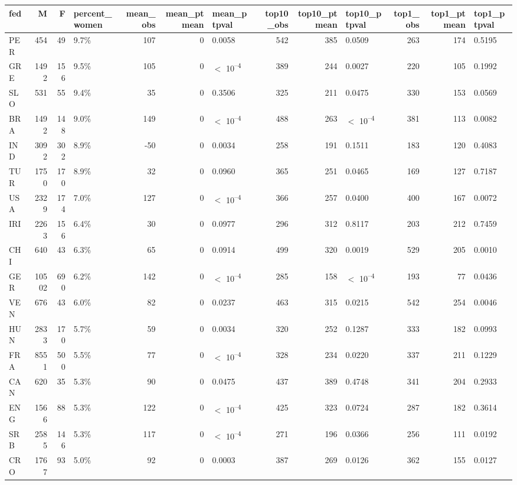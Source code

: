 
\begin{tabular}[t]{lrrlrrlrrlrrl}
\toprule
fed & M & F & percent_women & mean_obs & mean_ptmean & mean_ptpval & top10_obs & top10_ptmean & top10_ptpval & top1_obs & top1_ptmean & top1_ptpval\\
\midrule
PER & 454 & 49 & 9.7\% & 107 & 0 & 0.0058 & 542 & 385 & 0.0509 & 263 & 174 & 0.5195\\
GRE & 1492 & 156 & 9.5\% & 105 & 0 & $<$ 10\textsuperscript{--4} & 389 & 244 & 0.0027 & 220 & 105 & 0.1992\\
SLO & 531 & 55 & 9.4\% & 35 & 0 & 0.3506 & 325 & 211 & 0.0475 & 330 & 153 & 0.0569\\
BRA & 1492 & 148 & 9.0\% & 149 & 0 & $<$ 10\textsuperscript{--4} & 488 & 263 & $<$ 10\textsuperscript{--4} & 381 & 113 & 0.0082\\
IND & 3092 & 302 & 8.9\% & -50 & 0 & 0.0034 & 258 & 191 & 0.1511 & 183 & 120 & 0.4083\\
TUR & 1750 & 170 & 8.9\% & 32 & 0 & 0.0960 & 365 & 251 & 0.0465 & 169 & 127 & 0.7187\\
USA & 2329 & 174 & 7.0\% & 127 & 0 & $<$ 10\textsuperscript{--4} & 366 & 257 & 0.0400 & 400 & 167 & 0.0072\\
IRI & 2263 & 156 & 6.4\% & 30 & 0 & 0.0977 & 296 & 312 & 0.8117 & 203 & 212 & 0.7459\\
CHI & 640 & 43 & 6.3\% & 65 & 0 & 0.0914 & 499 & 320 & 0.0019 & 529 & 205 & 0.0010\\
GER & 10502 & 690 & 6.2\% & 142 & 0 & $<$ 10\textsuperscript{--4} & 285 & 158 & $<$ 10\textsuperscript{--4} & 193 & 77 & 0.0436\\
VEN & 676 & 43 & 6.0\% & 82 & 0 & 0.0237 & 463 & 315 & 0.0215 & 542 & 254 & 0.0046\\
HUN & 2833 & 170 & 5.7\% & 59 & 0 & 0.0034 & 320 & 252 & 0.1287 & 333 & 182 & 0.0993\\
FRA & 8551 & 500 & 5.5\% & 77 & 0 & $<$ 10\textsuperscript{--4} & 328 & 234 & 0.0220 & 337 & 211 & 0.1229\\
CAN & 620 & 35 & 5.3\% & 90 & 0 & 0.0475 & 437 & 389 & 0.4748 & 341 & 204 & 0.2933\\
ENG & 1566 & 88 & 5.3\% & 122 & 0 & $<$ 10\textsuperscript{--4} & 425 & 323 & 0.0724 & 287 & 182 & 0.3614\\
SRB & 2585 & 146 & 5.3\% & 117 & 0 & $<$ 10\textsuperscript{--4} & 271 & 196 & 0.0366 & 256 & 111 & 0.0192\\
CRO & 1767 & 93 & 5.0\% & 92 & 0 & 0.0003 & 387 & 269 & 0.0126 & 362 & 155 & 0.0127\\

\end{tabular}
